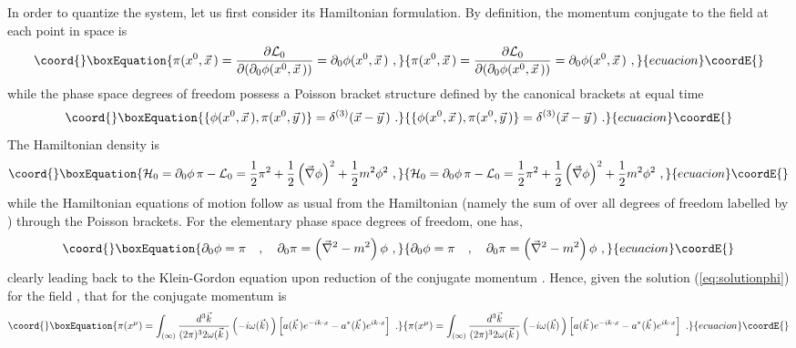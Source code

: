 \documentclass[a4paper,11pt]{article}
\begin{document}
In order to quantize the system, let us first consider its Hamiltonian
formulation. By definition, the momentum conjugate to the field
\coordHE{} at each point \coordHE{} in space is
\begin{equation}\coord{}\boxEquation{
\pi(x^0,\vec{x}\,)=\frac{\partial{\cal L}_0}
{\partial(\partial_0\phi(x^0,\vec{x}\,))}=\partial_0\phi(x^0,\vec{x}\,)\ ,
}{
\pi(x^0,\vec{x}\,)=\frac{\partial{\cal L}_0}
{\partial(\partial_0\phi(x^0,\vec{x}\,))}=\partial_0\phi(x^0,\vec{x}\,)\ ,
}{ecuacion}\coordE{}\end{equation}
while the phase space degrees of freedom 
\coordHE{} possess a Poisson bracket structure
defined by the canonical brackets at equal time \coordHE{}
\begin{equation}\coord{}\boxEquation{
\{\phi(x^0,\vec{x}\,),\pi(x^0,\vec{y}\,)\}=\delta^{(3)}(\vec{x}-\vec{y}\,)\ .
}{
\{\phi(x^0,\vec{x}\,),\pi(x^0,\vec{y}\,)\}=\delta^{(3)}(\vec{x}-\vec{y}\,)\ .
}{ecuacion}\coordE{}\end{equation}
The Hamiltonian density is
\begin{equation}\coord{}\boxEquation{
{\cal H}_0=\partial_0\phi\,\pi-{\cal L}_0=
\frac{1}{2}\pi^2+\frac{1}{2}\left(\vec{\nabla}\phi\right)^2+
\frac{1}{2}m^2\phi^2\ ,
}{
{\cal H}_0=\partial_0\phi\,\pi-{\cal L}_0=
\frac{1}{2}\pi^2+\frac{1}{2}\left(\vec{\nabla}\phi\right)^2+
\frac{1}{2}m^2\phi^2\ ,
}{ecuacion}\coordE{}\end{equation}
while the Hamiltonian equations of motion follow as usual from the
Hamiltonian \coordHE{} (namely the sum
of \coordHE{} over all degrees of freedom labelled by \coordHE{})
through the Poisson brackets. For the elementary phase space degrees 
of freedom, one has,
\begin{equation}\coord{}\boxEquation{
\partial_0\phi=\pi\ \ \ ,\ \ \ 
\partial_0\pi=\left(\vec{\nabla}^2-m^2\right)\phi\ ,
}{
\partial_0\phi=\pi\ \ \ ,\ \ \ 
\partial_0\pi=\left(\vec{\nabla}^2-m^2\right)\phi\ ,
}{ecuacion}\coordE{}\end{equation}
clearly leading back to the Klein-Gordon equation upon reduction of
the conjugate momentum \myHighlight{$\pi$}\coordHE{}. Hence, given the solution (\ref{eq:solutionphi})
for the field \myHighlight{$\phi(x^\mu)$}\coordHE{}, that for the conjugate momentum is
\begin{equation}\coord{}\boxEquation{
\pi(x^\mu)=\int_{(\infty)}\frac{d^3\vec{k}}{(2\pi)^32\omega(\vec{k}\,)}
\left(-i\omega(\vec{k})\,\right)
\left[a(\vec{k}\,)e^{-ik\cdot x}-a^*(\vec{k}\,)e^{ik\cdot x}\right]\ .
\label{eq:solutionpi}
}{
\pi(x^\mu)=\int_{(\infty)}\frac{d^3\vec{k}}{(2\pi)^32\omega(\vec{k}\,)}
\left(-i\omega(\vec{k})\,\right)
\left[a(\vec{k}\,)e^{-ik\cdot x}-a^*(\vec{k}\,)e^{ik\cdot x}\right]\ .
}{ecuacion}\coordE{}\end{equation}
\end{document}
